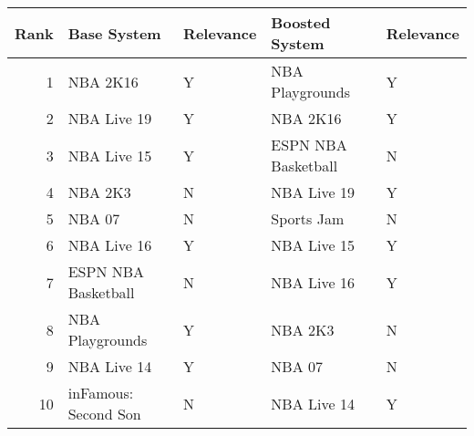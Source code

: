 \begin{tabular}{rllll}
\toprule
 Rank &          Base System & Relevance &      Boosted System & Relevance \\
\midrule
    1 &             NBA 2K16 &         Y &     NBA Playgrounds &         Y \\
    2 &          NBA Live 19 &         Y &            NBA 2K16 &         Y \\
    3 &          NBA Live 15 &         Y & ESPN NBA Basketball &         N \\
    4 &              NBA 2K3 &         N &         NBA Live 19 &         Y \\
    5 &               NBA 07 &         N &          Sports Jam &         N \\
    6 &          NBA Live 16 &         Y &         NBA Live 15 &         Y \\
    7 &  ESPN NBA Basketball &         N &         NBA Live 16 &         Y \\
    8 &      NBA Playgrounds &         Y &             NBA 2K3 &         N \\
    9 &          NBA Live 14 &         Y &              NBA 07 &         N \\
   10 & inFamous: Second Son &         N &         NBA Live 14 &         Y \\
\bottomrule
\end{tabular}
